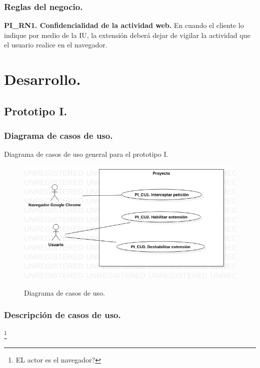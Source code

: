 \documentclass[12pt, a4paper, titlepage]{article}
\begin{document}
			\subsubsection{Reglas del negocio.}
				{\setlength{\parindent}{12pt}
					
					\textbf{PI\_RN1. Confidencialidad de la actividad web.} En cuando el cliente lo indique por medio de la IU, la extensión deberá dejar de vigilar la actividad que el usuario realice en el navegador.\\
					
				}\newpage
	\newpage
	\section{\textcolor{azulescom}{Desarrollo.}}
		\subsection{Prototipo I.}
			\subsubsection{Diagrama de casos de uso.}

				Diagrama de casos de uso general para el prototipo I.
				\begin{figure}[htb]
					\begin{center}
						\label{fig1} 
						\includegraphics[width=17cm]{./imagenes/UCD_1.jpg}
						\caption{Diagrama de casos de uso.}
					\end{center}
				\end{figure}\newpage	
					
			\subsubsection{Descripción de casos de uso.}
				\footnote{EL actor es el navegador?}
			
\end{document}
